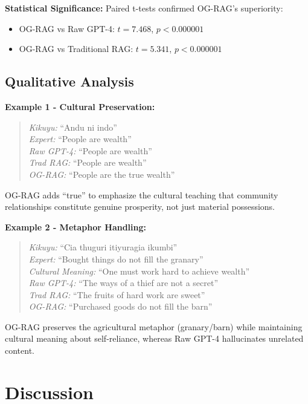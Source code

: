 \documentclass[11pt,twocolumn]{article}
\begin{document}
\textbf{Statistical Significance:} Paired t-tests confirmed OG-RAG's superiority:
\begin{itemize}
    \item OG-RAG vs Raw GPT-4: $t = 7.468$, $p < 0.000001$
    \item OG-RAG vs Traditional RAG: $t = 5.341$, $p < 0.000001$
\end{itemize}

\subsection{Qualitative Analysis}

\textbf{Example 1 - Cultural Preservation:}

\begin{quote}
\textit{Kikuyu:} ``Andu ni indo''\\
\textit{Expert:} ``People are wealth''\\
\textit{Raw GPT-4:} ``People are wealth''\\
\textit{Trad RAG:} ``People are wealth''\\
\textit{OG-RAG:} ``People are the true wealth''
\end{quote}

OG-RAG adds ``true'' to emphasize the cultural teaching that community relationships constitute genuine prosperity, not just material possessions.

\textbf{Example 2 - Metaphor Handling:}

\begin{quote}
\textit{Kikuyu:} ``Cia thuguri itiyuragia ikumbi''\\
\textit{Expert:} ``Bought things do not fill the granary''\\
\textit{Cultural Meaning:} ``One must work hard to achieve wealth''\\
\textit{Raw GPT-4:} ``The ways of a thief are not a secret''\\
\textit{Trad RAG:} ``The fruits of hard work are sweet''\\
\textit{OG-RAG:} ``Purchased goods do not fill the barn''
\end{quote}

OG-RAG preserves the agricultural metaphor (granary/barn) while maintaining cultural meaning about self-reliance, whereas Raw GPT-4 hallucinates unrelated content.

\section{Discussion}
\end{document}
